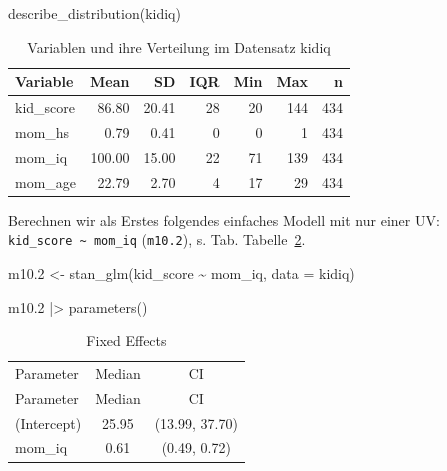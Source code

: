 \documentclass[
  ngerman,
  letterpaper,
  twoside,
  open=any]{scrbook}
\newenvironment{Shaded}{\begin{snugshade}}{\end{snugshade}}
\newcommand{\AttributeTok}[1]{\textcolor[rgb]{0.40,0.45,0.13}{#1}}
\newcommand{\FloatTok}[1]{\textcolor[rgb]{0.68,0.00,0.00}{#1}}
\newcommand{\FunctionTok}[1]{\textcolor[rgb]{0.28,0.35,0.67}{#1}}
\newcommand{\NormalTok}[1]{\textcolor[rgb]{0.00,0.23,0.31}{#1}}
\newcommand{\OtherTok}[1]{\textcolor[rgb]{0.00,0.23,0.31}{#1}}
\newcommand{\SpecialCharTok}[1]{\textcolor[rgb]{0.37,0.37,0.37}{#1}}
\theoremstyle{definition}
\theoremstyle{plain}
\theoremstyle{definition}
\theoremstyle{definition}
\theoremstyle{definition}
\theoremstyle{definition}
\theoremstyle{remark}
\begin{document}
\begin{Shaded}
\begin{Highlighting}[]
\FunctionTok{describe\_distribution}\NormalTok{(kidiq)}
\end{Highlighting}
\end{Shaded}

{

\begin{longtable}[]{@{}lrrrrrr@{}}

\caption{\label{tbl-kidiq1}Variablen und ihre Verteilung im Datensatz
kidiq}

\tabularnewline

\toprule\noalign{}
Variable & Mean & SD & IQR & Min & Max & n \\
\midrule\noalign{}
\endhead
\bottomrule\noalign{}
\endlastfoot
kid\_score & 86.80 & 20.41 & 28 & 20 & 144 & 434 \\
mom\_hs & 0.79 & 0.41 & 0 & 0 & 1 & 434 \\
mom\_iq & 100.00 & 15.00 & 22 & 71 & 139 & 434 \\
mom\_age & 22.79 & 2.70 & 4 & 17 & 29 & 434 \\

\end{longtable}

}

Berechnen wir als Erstes folgendes einfaches Modell mit nur einer UV:
\texttt{kid\_score\ \textasciitilde{}\ mom\_iq} (\texttt{m10.2}), s.
Tab. Tabelle~\ref{tbl-m102}.

\begin{Shaded}
\begin{Highlighting}[]
\NormalTok{m10}\FloatTok{.2} \OtherTok{\textless{}{-}}
  \FunctionTok{stan\_glm}\NormalTok{(kid\_score }\SpecialCharTok{\textasciitilde{}}\NormalTok{ mom\_iq, }\AttributeTok{data =}\NormalTok{ kidiq)}

\NormalTok{m10}\FloatTok{.2} \SpecialCharTok{|\textgreater{}} 
  \FunctionTok{parameters}\NormalTok{()}
\end{Highlighting}
\end{Shaded}

\begin{longtable}[]{@{}lcc@{}}

\caption{\label{tbl-m102}Parameter des Modells m10.2}

\tabularnewline

\caption{Fixed Effects}\tabularnewline
\toprule\noalign{}
Parameter & Median & CI \\
\midrule\noalign{}
\endfirsthead
\toprule\noalign{}
Parameter & Median & CI \\
\midrule\noalign{}
\endhead
\bottomrule\noalign{}
\endlastfoot
(Intercept) & 25.95 & (13.99, 37.70) \\
mom\_iq & 0.61 & (0.49, 0.72) \\

\end{longtable}
\end{document}
